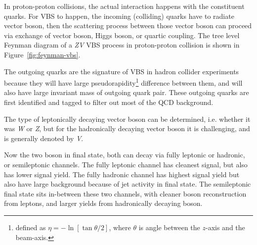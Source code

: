 In proton-proton collisions, the actual interaction happens
with the constituent quarks. For \gls{VBS} to happen, the incoming
(colliding) quarks have to radiate vector boson, then the scattering
process between those vector boson can proceed via exchange of vector
boson, Higgs boson, or quartic coupling. The tree level Feynman
diagram of a \textit{ZV} VBS process in proton-proton
collision is shown in Figure~\ref{fig:feynman-vbs}.

The outgoing quarks are the signature of \gls{VBS} in hadron collider
experiments because they will have large pseudorapidity\footnote{
  defined as \(\eta = - \ln[\tan \theta/2]\), where \(\theta \) is angle
  between the \(z\)-axis and the beam-axis. }
difference between
them, and will also have large invariant mass of outgoing quark pair.
These outgoing quarks are first identified
and tagged to filter out most of the \gls{QCD} background.

The type of leptonically decaying
vector boson can be determined, i.e.
whether it was \textit{W} or \textit{Z},
but for the hadronically decaying vector
boson it is challenging, and is generally denoted by \textit{V}.

Now the two boson
in final state, both can decay via fully leptonic or hadronic,
or semileptonic channels.
The fully leptonic channel has cleanest signal, but also has
lower signal yield. The fully hadronic channel has highest
signal yield but also have large background because of jet activity
in final state.
The semileptonic final state sits in-between these two channels,
with cleaner boson reconstruction from leptons, and larger yields
from hadronically decaying boson.

